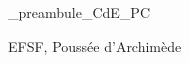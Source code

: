 



\ifdefined\mainIsLoaded\else
\RequirePackage{import}
{_preambule_CdE_PC}

\fi







\debutFicheEntrainement                                                                      %




\begin{prerequis}
	EFSF, Poussée d'Archimède
\end{prerequis}







